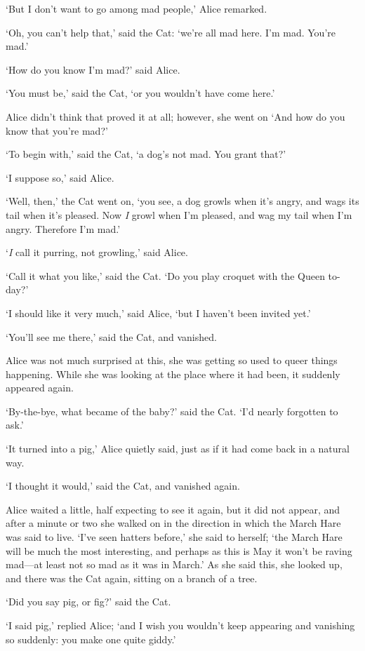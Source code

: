 \documentclass[12pt,openany]{memoir}
\begin{document}
`But I don't want to go among mad people,' Alice remarked.

`Oh, you can't help that,' said the Cat: `we're all mad here. I'm mad. You're mad.'

`How do you know I'm mad?' said Alice.

`You must be,' said the Cat, `or you wouldn't have come here.'

Alice didn't think that proved it at all; however, she went on `And how do you know that you're mad?'

`To begin with,' said the Cat, `a dog's not mad. You grant that?'

`I suppose so,' said Alice.

`Well, then,' the Cat went on, `you see, a dog growls when it's angry, and wags its tail when it's pleased. Now \textit{I} growl when I'm pleased, and wag my tail when I'm angry. Therefore I'm mad.'

`\textit{I} call it purring, not growling,' said Alice.

`Call it what you like,' said the Cat. `Do you play croquet with the Queen to-day?'

`I should like it very much,' said Alice, `but I haven't been invited yet.'

`You'll see me there,' said the Cat, and vanished.

Alice was not much surprised at this, she was getting so used to queer things happening. While she was looking at the place where it had been, it suddenly appeared again.

`By-the-bye, what became of the baby?' said the Cat. `I'd nearly forgotten to ask.'

`It turned into a pig,' Alice quietly said, just as if it had come back in a natural way.

`I thought it would,' said the Cat, and vanished again.

Alice waited a little, half expecting to see it again, but it did not appear, and after a minute or two she walked on in the direction in which the March Hare was said to live. `I've seen hatters before,' she said to herself; `the March Hare will be much the most interesting, and perhaps as this is May it won't be raving mad---at least not so mad as it was in March.' As she said this, she looked up, and there was the Cat again, sitting on a branch of a tree.

`Did you say pig, or fig?' said the Cat.

`I said pig,' replied Alice; `and I wish you wouldn't keep appearing and vanishing so suddenly: you make one quite giddy.'
\end{document}

